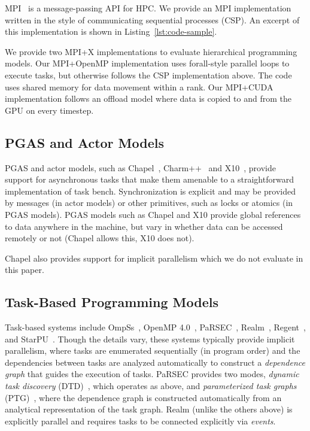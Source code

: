 MPI~\cite{MPI} is a message-passing API for HPC. We provide an MPI
implementation written in the style of communicating sequential
processes (CSP). An excerpt of this implementation is shown in
Listing~\ref{lst:code-sample}.

We provide two MPI+X implementations to evaluate hierarchical
programming models. Our MPI+OpenMP implementation uses forall-style
parallel loops to execute tasks, but otherwise follows the CSP
implementation above. The code uses shared memory for data movement
within a rank. Our MPI+CUDA implementation follows an offload model
where data is copied to and from the GPU on every timestep.

\subsection{PGAS and Actor Models}

PGAS and actor models, such as Chapel~\cite{Chapel15},
Charm++~\cite{Charmpp93} and X10~\cite{X1005}, provide support for
asynchronous tasks that make them amenable to a straightforward
implementation of task bench. Synchronization is explicit and may be
provided by messages (in actor models) or other primitives, such as
locks or atomics (in PGAS models). PGAS models such as Chapel and X10
provide global references to data anywhere in the machine, but vary in
whether data can be accessed remotely or not (Chapel allows this, X10
does not).

Chapel also provides support for implicit parallelism which we do not
evaluate in this paper.

\subsection{Task-Based Programming Models}

Task-based systems include OmpSs~\cite{OmpSs11}, OpenMP
4.0~\cite{OpenMPSpec40}, PaRSEC~\cite{PARSEC13, PARSEC_DTD},
Realm~\cite{Realm14}, Regent~\cite{Regent15}, and
StarPU~\cite{StarPU11}. Though the details vary, these systems
typically provide implicit parallelism, where tasks are enumerated
sequentially (in program order) and the dependencies between tasks are
analyzed automatically to construct a \emph{dependence graph} that
guides the execution of tasks. PaRSEC provides two modes,
\emph{dynamic task discovery} (DTD)~\cite{PARSEC_DTD}, which operates
as above, and \emph{parameterized task graphs} (PTG)~\cite{PARSEC13},
where the dependence graph is constructed automatically from an
analytical representation of the task graph. Realm (unlike the others
above) is explicitly parallel and requires tasks to be connected
explicitly via \emph{events}.

